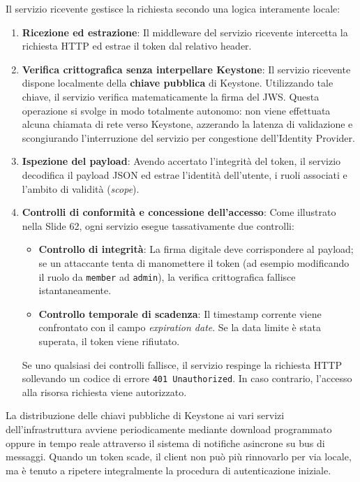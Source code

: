 \documentclass[11pt, a4paper]{article}
\begin{document}
Il servizio ricevente gestisce la richiesta secondo una logica interamente locale:
\begin{enumerate}
    \item \textbf{Ricezione ed estrazione}: Il middleware del servizio ricevente intercetta la richiesta HTTP ed estrae il token dal relativo header.
    \item \textbf{Verifica crittografica senza interpellare Keystone}: Il servizio ricevente dispone localmente della \textbf{chiave pubblica} di Keystone. Utilizzando tale chiave, il servizio verifica matematicamente la firma del JWS. Questa operazione si svolge in modo totalmente autonomo: non viene effettuata alcuna chiamata di rete verso Keystone, azzerando la latenza di validazione e scongiurando l'interruzione del servizio per congestione dell'Identity Provider.
    \item \textbf{Ispezione del payload}: Avendo accertato l'integrità del token, il servizio decodifica il payload JSON ed estrae l'identità dell'utente, i ruoli associati e l'ambito di validità (\emph{scope}).
    \item \textbf{Controlli di conformità e concessione dell'accesso}: Come illustrato nella Slide 62, ogni servizio esegue tassativamente due controlli:
    \begin{itemize}[noitemsep]
        \item \textbf{Controllo di integrità}: La firma digitale deve corrispondere al payload; se un attaccante tenta di manomettere il token (ad esempio modificando il ruolo da \texttt{member} ad \texttt{admin}), la verifica crittografica fallisce istantaneamente.
        \item \textbf{Controllo temporale di scadenza}: Il timestamp corrente viene confrontato con il campo \emph{expiration date}. Se la data limite è stata superata, il token viene rifiutato.
    \end{itemize}
    Se uno qualsiasi dei controlli fallisce, il servizio respinge la richiesta HTTP sollevando un codice di errore \texttt{401 Unauthorized}. In caso contrario, l'accesso alla risorsa richiesta viene autorizzato.
\end{enumerate}

La distribuzione delle chiavi pubbliche di Keystone ai vari servizi dell'infrastruttura avviene periodicamente mediante download programmato oppure in tempo reale attraverso il sistema di notifiche asincrone su bus di messaggi. Quando un token scade, il client non può più rinnovarlo per via locale, ma è tenuto a ripetere integralmente la procedura di autenticazione iniziale.
\end{document}

